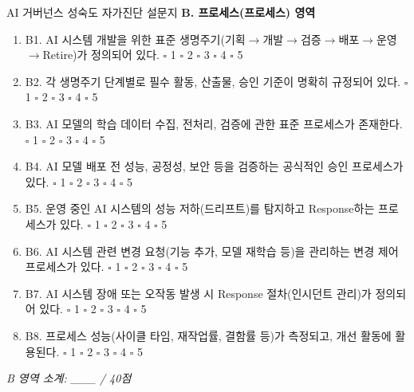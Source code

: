 \begin{practicaltool}{AI 거버넌스 성숙도 자가진단 설문지}
\textbf{B. 프로세스(프로세스) 영역}
\begin{enumerate}
 \item B1. AI 시스템 개발을 위한 표준 생명주기(기획$\to$개발$\to$검증$\to$배포$\to$운영$\to$Retire)가 정의되어 있다. \hfill $\square$ 1 $\square$ 2 $\square$ 3 $\square$ 4 $\square$ 5
 \item B2. 각 생명주기 단계별로 필수 활동, 산출물, 승인 기준이 명확히 규정되어 있다. \hfill $\square$ 1 $\square$ 2 $\square$ 3 $\square$ 4 $\square$ 5
 \item B3. AI 모델의 학습 데이터 수집, 전처리, 검증에 관한 표준 프로세스가 존재한다. \hfill $\square$ 1 $\square$ 2 $\square$ 3 $\square$ 4 $\square$ 5
 \item B4. AI 모델 배포 전 성능, 공정성, 보안 등을 검증하는 공식적인 승인 프로세스가 있다. \hfill $\square$ 1 $\square$ 2 $\square$ 3 $\square$ 4 $\square$ 5
 \item B5. 운영 중인 AI 시스템의 성능 저하(드리프트)를 탐지하고 Response하는 프로세스가 있다. \hfill $\square$ 1 $\square$ 2 $\square$ 3 $\square$ 4 $\square$ 5
 \item B6. AI 시스템 관련 변경 요청(기능 추가, 모델 재학습 등)을 관리하는 변경 제어 프로세스가 있다. \hfill $\square$ 1 $\square$ 2 $\square$ 3 $\square$ 4 $\square$ 5
 \item B7. AI 시스템 장애 또는 오작동 발생 시 Response 절차(인시던트 관리)가 정의되어 있다. \hfill $\square$ 1 $\square$ 2 $\square$ 3 $\square$ 4 $\square$ 5
 \item B8. 프로세스 성능(사이클 타임, 재작업률, 결함률 등)가 측정되고, 개선 활동에 활용된다. \hfill $\square$ 1 $\square$ 2 $\square$ 3 $\square$ 4 $\square$ 5
\end{enumerate}
\textit{B 영역 소계: \_\_\_ / 40점}


\end{practicaltool}
